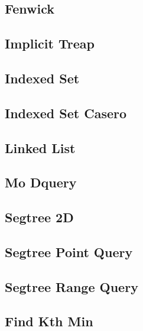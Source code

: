 \documentclass[10pt,landscape,twocolumn,a4paper,notitlepage]{article}
\newcommand\cppfile[2][]{

}
\begin{document}
\subsection{Fenwick}
\cppfile{data_structures/fenwick.cpp}

\subsection{Implicit Treap}
\cppfile{data_structures/implicit_treap.cpp}

\subsection{Indexed Set}
\cppfile{data_structures/indexed_set.cpp}

\subsection{Indexed Set Casero}
\cppfile{data_structures/indexed_set_casero.cpp}

\subsection{Linked List}
\cppfile{data_structures/linked_list.cpp}

\subsection{Mo Dquery}
\cppfile{data_structures/Mo_DQuery.cpp}

\subsection{Segtree 2D}
\cppfile{data_structures/segment_tree_iterative/segtree_2d.cpp}

\subsection{Segtree Point Query}
\cppfile{data_structures/segment_tree_iterative/segtree_point_query.cpp}

\subsection{Segtree Range Query}
\cppfile{data_structures/segment_tree_iterative/segtree_range_query.cpp}

\newpage

\subsection{Find Kth Min}
\cppfile{data_structures/segment_tree_recursive/Find_kth_min.cpp}
\end{document}
